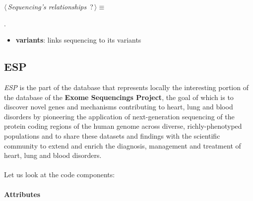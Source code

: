 	\begin{flushleft} \small
\begin{minipage}{\linewidth}\label{scrap13}\raggedright\small
{} $\langle\,${\itshape {Sequencing's relationships}}\nobreak\ {\footnotesize {?}}$\,\rangle\equiv$
\vspace{-1ex}
\begin{list}{}{} \item

                
        {\NWsep}
\end{list}
\vspace{-1.5ex}
\footnotesize
\begin{list}{}{\setlength{\itemsep}{-\parsep}\setlength{\itemindent}{-\leftmargin}}
\item {\NWtxtMacroNoRef}.

\item{}
\end{list}
\end{minipage}\vspace{4ex}
\end{flushleft}
\begin{itemize}
 	\item \textbf{variants}: links sequencing to its variants
\end{itemize}


\subsection{ESP}
\emph{ESP} is the part of the database that represents locally the interesting portion of the database of the \textbf{Exome Sequencings Project}, the goal of which is to discover novel genes and mechanisms contributing to heart, lung and blood disorders by pioneering the application of next-generation sequencing of the protein coding regions of the human genome across diverse, richly-phenotyped populations and to share these datasets and findings with the scientific community to extend and enrich the diagnosis, management and treatment of heart, lung and blood disorders.
\\
\\Let us look at the code components:

\paragraph{Attributes}      

